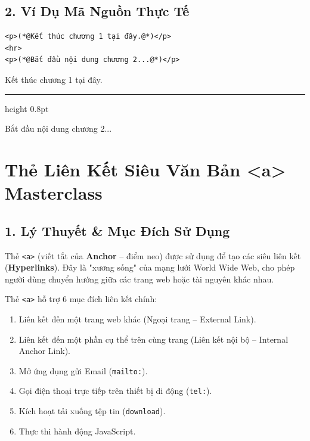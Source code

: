 \documentclass[11pt,oneside]{book}
\newcommand{\codeinline}[1]{\textcolor{accentOrange}{\texttt{#1}}}
\newcommand{\term}[1]{\textbf{\textcolor{primaryBlue}{#1}}}
\begin{document}
\subsection{2. Ví Dụ Mã Nguồn Thực Tế}
\begin{codeWindow}
\begin{lstlisting}[language=HTML5]
<p>(*@Kết thúc chương 1 tại đây.@*)</p>
<hr>
<p>(*@Bắt đầu nội dung chương 2...@*)</p>
\end{lstlisting}
\end{codeWindow}

\begin{browserWindow}
\sffamily\small
Kết thúc chương 1 tại đây.\par\vspace{4pt}
{\color{gray!40}\hrule height 0.8pt}\vspace{4pt}
Bắt đầu nội dung chương 2...
\end{browserWindow}

\section{Thẻ Liên Kết Siêu Văn Bản <a> Masterclass}
\label{sec:anchor_tag_masterclass}

\subsection{1. Lý Thuyết \& Mục Đích Sử Dụng}
Thẻ \codeinline{<a>} (viết tắt của \term{Anchor} -- điểm neo) được sử dụng để tạo các siêu liên kết (\term{Hyperlinks}). Đây là "xương sống" của mạng lưới World Wide Web, cho phép người dùng chuyển hướng giữa các trang web hoặc tài nguyên khác nhau.

Thẻ \codeinline{<a>} hỗ trợ 6 mục đích liên kết chính:
\begin{enumerate}
    \item Liên kết đến một trang web khác (Ngoại trang -- External Link).
    \item Liên kết đến một phần cụ thể trên cùng trang (Liên kết nội bộ -- Internal Anchor Link).
    \item Mở ứng dụng gửi Email (\codeinline{mailto:}).
    \item Gọi điện thoại trực tiếp trên thiết bị di động (\codeinline{tel:}).
    \item Kích hoạt tải xuống tệp tin (\codeinline{download}).
    \item Thực thi hành động JavaScript.
\end{enumerate}
\end{document}
